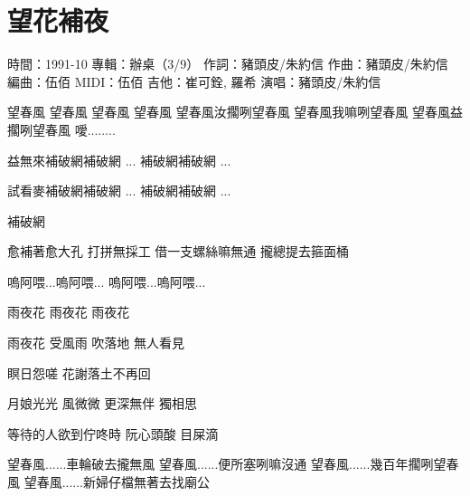 \documentclass[UTF8,a4paper,oneside,twocolumn,12pt]{ctexbook}
\newcommand{\infopair}[2]{\textbullet #1：#2}
\newcommand{\zc}[1][伍佰]{\infopair{作詞}{#1}}
\newcommand{\zq}[1][伍佰]{\infopair{作曲}{#1}}
\newcommand{\bq}[1][伍佰]{\infopair{編曲}{#1}}
\newcommand{\zj}[1]{\infopair{專輯}{#1}}
\newcommand{\sj}[1]{\infopair{時間}{#1}}
\newenvironment{info}{\begin{flushleft}\kaishu
	}
	{\end{flushleft}\normalsize\yahei\par}
\newenvironment{lyric}{
	}
{}
\begin{document}
\section{望花補夜}
\begin{info}
	\sj{1991-10}
	\zj{辦桌（3/9）}
	\zc[豬頭皮/朱約信]
	\zq[豬頭皮/朱約信]
	\bq[伍佰]
	\infopair{MIDI}{伍佰}
	\infopair{吉他}{崔可銓, 羅希}
	\infopair{演唱}{豬頭皮/朱約信}
\end{info}
\begin{lyric}
	望春風 望春風
	望春風 望春風
	望春風汝擱咧望春風
	望春風我嘛咧望春風
	望春風益擱咧望春風
	噯........

	益無來補破網補破網
	... 補破網補破網 ...

	試看麥補破網補破網
	... 補破網補破網 ...

	補破網

	愈補著愈大孔 打拼無採工
	借一支螺絲嘛無通
	攏總提去箍面桶

	嗚阿喂...嗚阿喂...
	嗚阿喂...嗚阿喂...

	雨夜花 雨夜花 雨夜花

	雨夜花 受風雨
	吹落地 無人看見

	瞑日怨嗟
	花謝落土不再回

	月娘光光 風微微
	更深無伴 獨相思

	等待的人欲到佇咚時
	阮心頭酸 目屎滴

	望春風......車輪破去攏無風
	望春風......便所塞咧嘛沒通
	望春風......幾百年擱咧望春風
	望春風......新婦仔檔無著去找廟公
\end{lyric}
\end{document}
